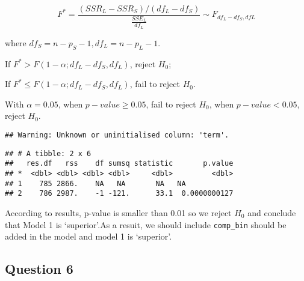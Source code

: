 \documentclass[]{article}
\newenvironment{Shaded}{\begin{snugshade}}{\end{snugshade}}
\newcommand{\KeywordTok}[1]{\textcolor[rgb]{0.13,0.29,0.53}{\textbf{#1}}}
\newcommand{\DataTypeTok}[1]{\textcolor[rgb]{0.13,0.29,0.53}{#1}}
\newcommand{\StringTok}[1]{\textcolor[rgb]{0.31,0.60,0.02}{#1}}
\newcommand{\CommentTok}[1]{\textcolor[rgb]{0.56,0.35,0.01}{\textit{#1}}}
\newcommand{\OperatorTok}[1]{\textcolor[rgb]{0.81,0.36,0.00}{\textbf{#1}}}
\newcommand{\NormalTok}[1]{#1}
\begin{document}
\[ F^*=\frac{(SSR_L-SSR_S)/(df_L-df_S)}{\frac{SSE_L}{df_L}} \sim F_{df_L-df_S,dfL} \]

where \(df_S = n-p_S-1, df_L = n-p_L-1\).

If \(F^* > F(1-\alpha;df_L-df_S,df_L)\), reject \(H_0\);

If \(F^* \leq F(1-\alpha;df_L-df_S,df_L)\), fail to reject \(H_0\).

With \(\alpha = 0.05\), when \(p-value \geq 0.05\), fail to reject
\(H_0\), when \(p-value < 0.05\), reject \(H_0\).

\begin{Shaded}
\end{Shaded}

\begin{verbatim}
## Warning: Unknown or uninitialised column: 'term'.
\end{verbatim}

\begin{verbatim}
## # A tibble: 2 x 6
##   res.df   rss    df sumsq statistic       p.value
## *  <dbl> <dbl> <dbl> <dbl>     <dbl>         <dbl>
## 1    785 2866.    NA   NA       NA   NA           
## 2    786 2987.    -1 -121.      33.1  0.0000000127
\end{verbatim}

According to results, p-value is smaller than 0.01 so we reject \(H_0\)
and conclude that Model 1 is `superior'.As a resuit, we should include
\texttt{comp\_bin} should be added in the model and model 1 is
`superior'.

\subsection{Question 6}\label{question-6}

\begin{Shaded}
\end{Shaded}
\end{document}
